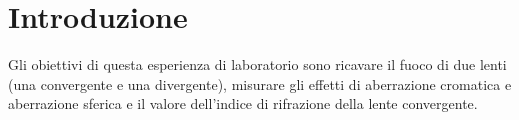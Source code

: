 \section{Introduzione}

Gli obiettivi di questa esperienza di laboratorio sono ricavare il fuoco di due lenti (una convergente e una divergente),
misurare gli effetti di aberrazione cromatica e aberrazione sferica e il valore dell'indice di rifrazione della lente convergente. 

